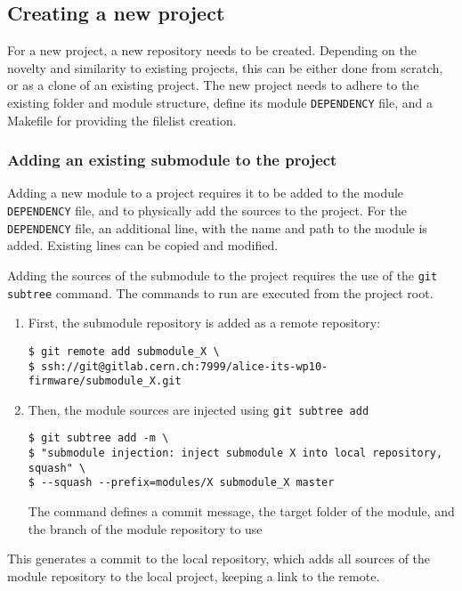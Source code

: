 \documentclass{scrartcl}
\begin{document}
\subsection{Creating a new project}

For a new project, a new repository needs to be created. Depending on
the novelty and similarity to existing projects, this can be either
done from scratch, or as a clone of an existing project. The new
project needs to adhere to the existing folder and module structure,
define its module \verb|DEPENDENCY| file, and a Makefile for providing
the filelist creation.

\subsubsection{Adding an existing submodule to the project}

Adding a new module to a project requires it to be added to the module
\verb|DEPENDENCY| file, and to physically add the sources to the
project. For the \verb|DEPENDENCY| file, an additional line, with the
name and path to the module is added. Existing lines can be copied and
modified.

Adding the sources of the submodule to the project requires the use of
the \verb|git subtree| command. The commands to run are executed from
the project root.

\begin{enumerate}
\item First, the submodule repository is added as a remote
repository:

\begin{verbatim}
$ git remote add submodule_X \
$ ssh://git@gitlab.cern.ch:7999/alice-its-wp10-firmware/submodule_X.git
\end{verbatim}

\item Then, the module sources are injected using \verb|git subtree add|

\begin{verbatim}
$ git subtree add -m \
$ "submodule injection: inject submodule X into local repository, squash" \
$ --squash --prefix=modules/X submodule_X master
\end{verbatim}

  The command defines a commit message, the target folder of the
  module, and the branch of the module repository to use
\end{enumerate}

This generates a commit to the local repository, which adds all
sources of the module repository to the local project, keeping a link
to the remote.
\end{document}
